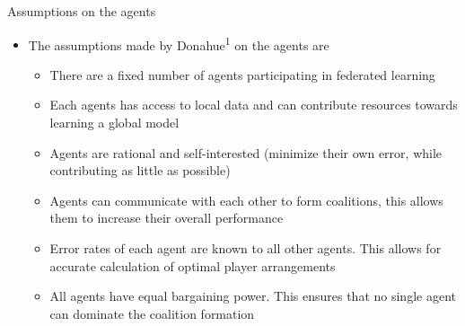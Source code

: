 \documentclass[aspectratio=169]{beamer}
\begin{document}
\begin{frame}[label={sec:orgd507399}]{Assumptions on the agents}
\begin{itemize}
\item The assumptions made by Donahue\textsuperscript{1} on the agents are
\begin{itemize}
\item There are a fixed number of agents participating in federated learning
\item Each agents has access to local data and can contribute resources towards learning a global model
\item Agents are rational and self-interested (minimize their own error, while contributing as little as possible)
\item Agents can communicate with each other to form coalitions, this allows them to increase their overall performance
\item Error rates of each agent are known to all other agents. This allows for accurate calculation of optimal player arrangements
\item All agents have equal bargaining power. This ensures that no single agent can dominate the coalition formation
\end{itemize}
\end{itemize}

\end{frame}
\end{document}
